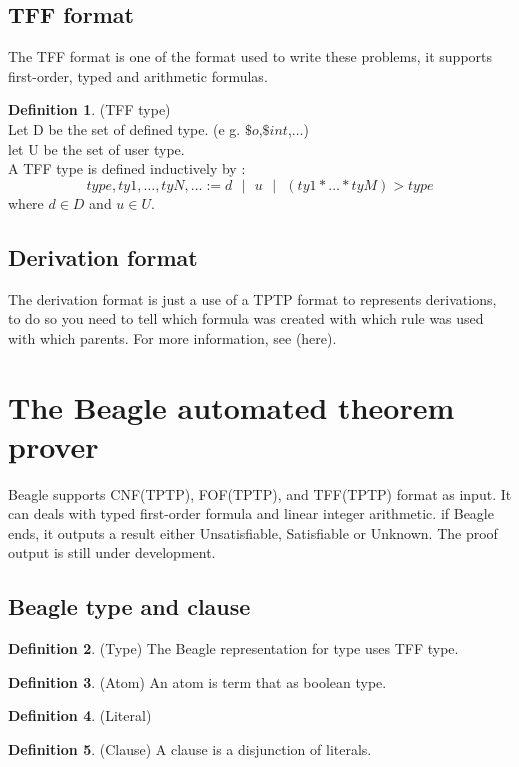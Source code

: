 \documentclass[a4paper, 11pt]{article}
\theoremstyle{plain}
\theoremstyle{definition}
\newtheorem*{mydef}{Definition}
\theoremstyle{remark}
\newcommand\sep{\mbox{ } | \mbox{ }}
\begin{document}
\subsection{TFF format}
 The TFF format is one of the format used to write these problems, it supports first-order, typed and arithmetic formulas. 
\begin{mydef} (TFF type)
\\Let D be the set of defined type. (e g. $\$o$,$\$int$,$\ldots$)
\\let U be the set of user type.
\\A TFF type is defined inductively by :
\[type,ty1,\ldots,tyN,\ldots := d \sep u \sep (ty1 * \ldots * tyM) > type\]
where $d \in D$ and $u \in U$.
\end{mydef}

\subsection{Derivation format}
  The derivation format is just a use of a TPTP format to represents derivations, to do so you need to tell which formula was created with which rule was used with which parents. For more information, see (here).

\section{The Beagle automated theorem prover}
  Beagle supports CNF(TPTP), FOF(TPTP), and TFF(TPTP) format as input.
It can deals with typed first-order formula and linear integer arithmetic.  
  if Beagle ends, it outputs a result either Unsatisfiable, Satisfiable or Unknown. The proof output is still under development.


\subsection{Beagle type and clause}
\begin{mydef} (Type) The Beagle representation for type uses TFF type.
\end{mydef} 
\begin{mydef} (Atom) An atom is term that as boolean type. \end{mydef} 
\begin{mydef} (Literal) 
\end{mydef}
\begin{mydef} (Clause) A clause is a disjunction of literals.
\end{mydef}
\end{document}
